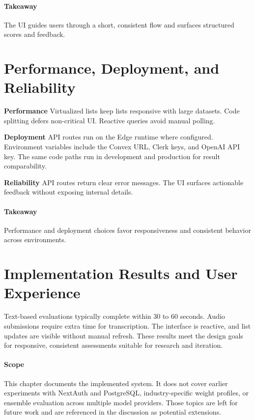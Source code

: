 \paragraph{Takeaway} The UI guides users through a short, consistent flow and surfaces structured scores and feedback.

\section{Performance, Deployment, and Reliability}
\textbf{Performance} Virtualized lists keep lists responsive with large datasets. Code splitting defers non-critical UI. Reactive queries avoid manual polling.

\textbf{Deployment} API routes run on the Edge runtime where configured. Environment variables include the Convex URL, Clerk keys, and OpenAI API key. The same code paths run in development and production for result comparability.

\textbf{Reliability} API routes return clear error messages. The UI surfaces actionable feedback without exposing internal details.

\paragraph{Takeaway} Performance and deployment choices favor responsiveness and consistent behavior across environments.

\section{Implementation Results and User Experience}\label{sec:results}
Text-based evaluations typically complete within 30 to 60 seconds. Audio submissions require extra time for transcription. The interface is reactive, and list updates are visible without manual refresh. These results meet the design goals for responsive, consistent assessments suitable for research and iteration.

\paragraph{Scope} This chapter documents the implemented system. It does not cover earlier experiments with NextAuth and PostgreSQL, industry-specific weight profiles, or ensemble evaluation across multiple model providers. Those topics are left for future work and are referenced in the discussion as potential extensions.
